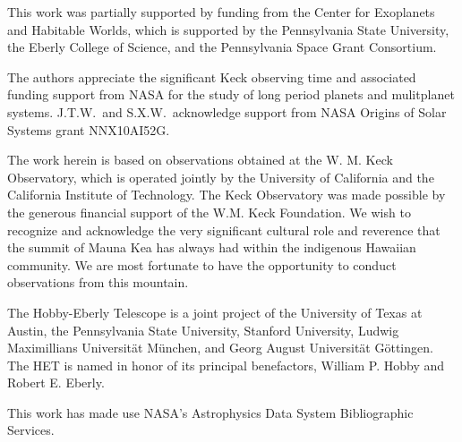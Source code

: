 \documentclass{emulateapj}
\begin{document}
\begin{CJK*}{UTF8}{gbsn}
This work was partially supported by funding from the Center for
Exoplanets and Habitable Worlds, which is supported by the
Pennsylvania State University, the Eberly College of Science, and the
Pennsylvania Space Grant Consortium.

The authors appreciate the significant Keck observing time and
associated funding support from NASA for the study of long period
planets and mulitplanet systems.
%
J.T.W.\ and S.X.W.\ acknowledge support from NASA Origins of Solar
Systems grant NNX10AI52G.

The work herein is based on observations obtained at the W. M. Keck
Observatory, which is operated jointly by the University of California
and the California Institute of Technology.  The Keck Observatory was
made possible by the generous financial support of the W.M. Keck
Foundation.  We wish to recognize and acknowledge the very significant
cultural role and reverence that the summit of Mauna Kea has always
had within the indigenous Hawaiian community.  We are most fortunate
to have the opportunity to conduct observations from this mountain.

The Hobby-Eberly Telescope is a joint project of the University of
Texas at Austin, the Pennsylvania State University, Stanford
University, Ludwig Maximillians Universit\"at M\"unchen, and Georg
August Universit\"at G\"ottingen. The HET is named in honor of its
principal benefactors, William P. Hobby and Robert E. Eberly.

This work has made use NASA’s Astrophysics Data System Bibliographic Services.


\end{CJK*}


\end{document}

